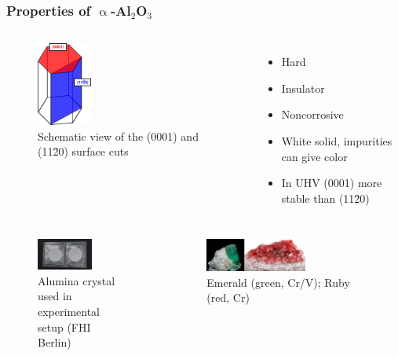 \documentclass[hyperref={pdfpagelabels=false}]{beamer}
\begin{document}
\begin{frame}
 \frametitle{Properties of $\upalpha$-Al$_2$O$_3$}
 \begin{columns}
  \begin{figure}
  \includegraphics[width=0.3\textwidth]{figures/al2o3-crystal.png}
  \caption{Schematic view of the (0001) and (11\=20) surface cuts}
  \end{figure}
  \begin{itemize}
  \item Hard
  \item Insulator
  \item Noncorrosive
  \item White solid, impurities can give color
  \item In UHV (0001) more stable than (11\=20)
  \end{itemize}
 \end{columns}
 \pause
\begin{columns}
  \begin{figure}
  \includegraphics[width=0.6\textwidth]{figures/Al2O3.jpg}
  \caption{Alumina crystal used in experimental setup (FHI Berlin)}
 \end{figure}
   \begin{figure}
  \includegraphics[width=0.6\textwidth]{figures/emerald-ruby.eps}
  \caption{Emerald (green, Cr/V); Ruby (red, Cr)}
  \end{figure}
 \end{columns}
\end{frame}
\end{document}

